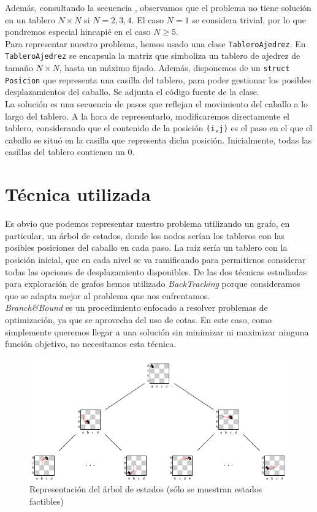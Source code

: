 \documentclass[11pt]{article}
\begin{document}
Además, consultando la secuencia \cite{sequence}, observamos que el problema no tiene solución en un tablero $N\times N$ si $N=2,3,4$. El caso $N=1$ se considera trivial, por lo que pondremos especial hincapié en el caso $N\ge5$.\\

Para representar nuestro problema, hemos usado una clase \verb|TableroAjedrez|. En \verb|TableroAjedrez| se encapsula la matriz que simboliza un tablero de ajedrez de tamaño $N\times N$, hasta un máximo fijado. Además, disponemos de un \verb|struct Posicion| que representa una casilla del tablero, para poder gestionar los posibles desplazamientos del caballo. Se adjunta el código fuente de la clase.\\

La solución es una secuencia de pasos que reflejan el movimiento del caballo a lo largo del tablero. A la hora de representarlo, modificaremos directamente el tablero, considerando que el contenido de la posición \verb|(i,j)| es el paso en el que el caballo se situó en la casilla que representa dicha posición. Inicialmente, todas las casillas del tablero contienen un $0$.

\section*{Técnica utilizada}

Es obvio que podemos representar nuestro problema utilizando un grafo, en particular, un árbol de estados, donde los nodos serían los tableros con las posibles posiciones del caballo en cada paso. La raíz sería un tablero con la posición inicial, que en cada nivel se va ramificando para permitirnos considerar todas las opciones de desplazamiento disponibles. De las dos técnicas estudiadas para exploración de grafos hemos utilizado \textit{BackTracking} porque consideramos que se adapta mejor al problema que nos enfrentamos.\\

\textit{Branch\&Bound} es un procedimiento enfocado a resolver problemas de optimización, ya que se aprovecha del uso de cotas. En este caso, como simplemente queremos llegar a una solución sin minimizar ni maximizar ninguna función objetivo, no necesitamos esta técnica.


\begin{figure}[h]
  \centering
\includegraphics[scale=1.3]{img/arbol-estados.pdf}
\caption{Representación del árbol de estados (sólo se muestran estados factibles)} \label{fig:árbol}
\end{figure}
\end{document}
